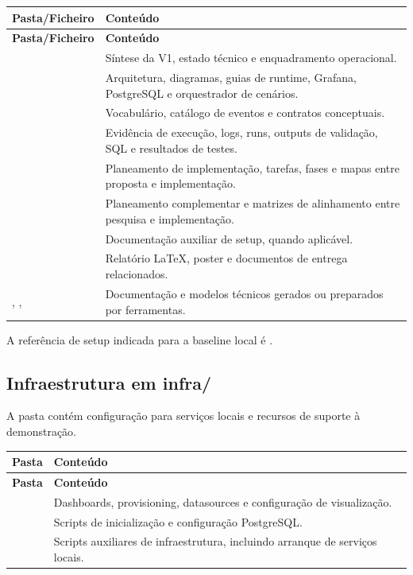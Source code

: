\begin{longtable}{L{0.36\textwidth} L{0.54\textwidth}}
\toprule
\textbf{Pasta/Ficheiro} & \textbf{Conteúdo} \\
\midrule
\endfirsthead
\toprule
\textbf{Pasta/Ficheiro} & \textbf{Conteúdo} \\
\midrule
\endhead
{} & Síntese da V1, estado técnico e enquadramento operacional. \\
 & Arquitetura, diagramas, guias de runtime, Grafana, PostgreSQL e orquestrador de cenários. \\
 & Vocabulário, catálogo de eventos e contratos conceptuais. \\
 & Evidência de execução, logs, runs, outputs de validação, SQL e resultados de testes. \\
 & Planeamento de implementação, tarefas, fases e mapas entre proposta e implementação. \\
 & Planeamento complementar e matrizes de alinhamento entre pesquisa e implementação. \\
 & Documentação auxiliar de setup, quando aplicável. \\
 & Relatório LaTeX, poster e documentos de entrega relacionados. \\
, ,  & Documentação e modelos técnicos gerados ou preparados por ferramentas. \\
\bottomrule
\end{longtable}

A referência de setup indicada para a baseline local é .

\subsection{Infraestrutura em infra/}

A pasta  contém configuração para serviços locais e recursos de suporte à demonstração.

\begin{longtable}{L{0.30\textwidth} L{0.60\textwidth}}
\toprule
\textbf{Pasta} & \textbf{Conteúdo} \\
\midrule
\endfirsthead
\toprule
\textbf{Pasta} & \textbf{Conteúdo} \\
\midrule
\endhead
{} & Dashboards, provisioning, datasources e configuração de visualização. \\
 & Scripts de inicialização e configuração PostgreSQL. \\
 & Scripts auxiliares de infraestrutura, incluindo arranque de serviços locais. \\
\bottomrule
\end{longtable}

